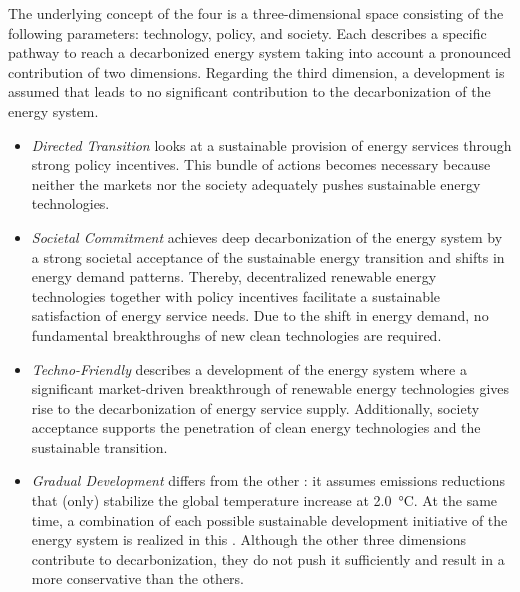The underlying concept of the four  is a three-dimensional space consisting of the following parameters: technology, policy, and society. Each  describes a specific pathway to reach a decarbonized energy system taking into account a pronounced contribution of two dimensions. Regarding the third dimension, a development is assumed that leads to no significant contribution to the decarbonization of the energy system. 

\begin{itemize}
	\item \textit{Directed Transition}  looks at a sustainable provision of energy services through strong policy incentives. This bundle of actions becomes necessary because neither the markets nor the society adequately pushes sustainable energy technologies.
	\item \textit{Societal Commitment}  achieves deep decarbonization of the energy system by a strong societal acceptance of the sustainable energy transition and shifts in energy demand patterns. Thereby, decentralized renewable energy technologies together with policy incentives facilitate a sustainable satisfaction of energy service needs. Due to the shift in energy demand, no fundamental breakthroughs of new clean technologies are required.
	\item \textit{Techno-Friendly}  describes a development of the energy system where a significant market-driven breakthrough of renewable energy technologies gives rise to the decarbonization of energy service supply. Additionally, society acceptance supports the penetration of clean energy technologies and the sustainable transition.
	\item \textit{Gradual Development}  differs from the other : it assumes emissions reductions that (only) stabilize the global temperature increase at \SI{2.0}{\degreeCelsius}. At the same time, a combination of each possible sustainable development initiative of the energy system is realized in this . Although the other three dimensions contribute to decarbonization, they do not push it sufficiently and result in a more conservative  than the others.
\end{itemize}

